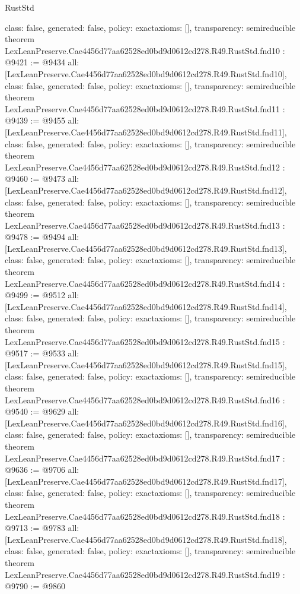 \begin{lexlean}{RustStd}
\begin{coremodule}
{  class: false,
  generated: false,
  policy: exact{axioms: []},
  transparency: semireducible
}
theorem LexLeanPreserve.Cae4456d77aa62528ed0bd9d0612cd278.R49.RustStd.fnd10 : @9421 := @9434 {
  all: [LexLeanPreserve.Cae4456d77aa62528ed0bd9d0612cd278.R49.RustStd.fnd10],
  class: false,
  generated: false,
  policy: exact{axioms: []},
  transparency: semireducible
}
theorem LexLeanPreserve.Cae4456d77aa62528ed0bd9d0612cd278.R49.RustStd.fnd11 : @9439 := @9455 {
  all: [LexLeanPreserve.Cae4456d77aa62528ed0bd9d0612cd278.R49.RustStd.fnd11],
  class: false,
  generated: false,
  policy: exact{axioms: []},
  transparency: semireducible
}
theorem LexLeanPreserve.Cae4456d77aa62528ed0bd9d0612cd278.R49.RustStd.fnd12 : @9460 := @9473 {
  all: [LexLeanPreserve.Cae4456d77aa62528ed0bd9d0612cd278.R49.RustStd.fnd12],
  class: false,
  generated: false,
  policy: exact{axioms: []},
  transparency: semireducible
}
theorem LexLeanPreserve.Cae4456d77aa62528ed0bd9d0612cd278.R49.RustStd.fnd13 : @9478 := @9494 {
  all: [LexLeanPreserve.Cae4456d77aa62528ed0bd9d0612cd278.R49.RustStd.fnd13],
  class: false,
  generated: false,
  policy: exact{axioms: []},
  transparency: semireducible
}
theorem LexLeanPreserve.Cae4456d77aa62528ed0bd9d0612cd278.R49.RustStd.fnd14 : @9499 := @9512 {
  all: [LexLeanPreserve.Cae4456d77aa62528ed0bd9d0612cd278.R49.RustStd.fnd14],
  class: false,
  generated: false,
  policy: exact{axioms: []},
  transparency: semireducible
}
theorem LexLeanPreserve.Cae4456d77aa62528ed0bd9d0612cd278.R49.RustStd.fnd15 : @9517 := @9533 {
  all: [LexLeanPreserve.Cae4456d77aa62528ed0bd9d0612cd278.R49.RustStd.fnd15],
  class: false,
  generated: false,
  policy: exact{axioms: []},
  transparency: semireducible
}
theorem LexLeanPreserve.Cae4456d77aa62528ed0bd9d0612cd278.R49.RustStd.fnd16 : @9540 := @9629 {
  all: [LexLeanPreserve.Cae4456d77aa62528ed0bd9d0612cd278.R49.RustStd.fnd16],
  class: false,
  generated: false,
  policy: exact{axioms: []},
  transparency: semireducible
}
theorem LexLeanPreserve.Cae4456d77aa62528ed0bd9d0612cd278.R49.RustStd.fnd17 : @9636 := @9706 {
  all: [LexLeanPreserve.Cae4456d77aa62528ed0bd9d0612cd278.R49.RustStd.fnd17],
  class: false,
  generated: false,
  policy: exact{axioms: []},
  transparency: semireducible
}
theorem LexLeanPreserve.Cae4456d77aa62528ed0bd9d0612cd278.R49.RustStd.fnd18 : @9713 := @9783 {
  all: [LexLeanPreserve.Cae4456d77aa62528ed0bd9d0612cd278.R49.RustStd.fnd18],
  class: false,
  generated: false,
  policy: exact{axioms: []},
  transparency: semireducible
}
theorem LexLeanPreserve.Cae4456d77aa62528ed0bd9d0612cd278.R49.RustStd.fnd19 : @9790 := @9860 {
}
\end{coremodule}
\end{lexlean}
